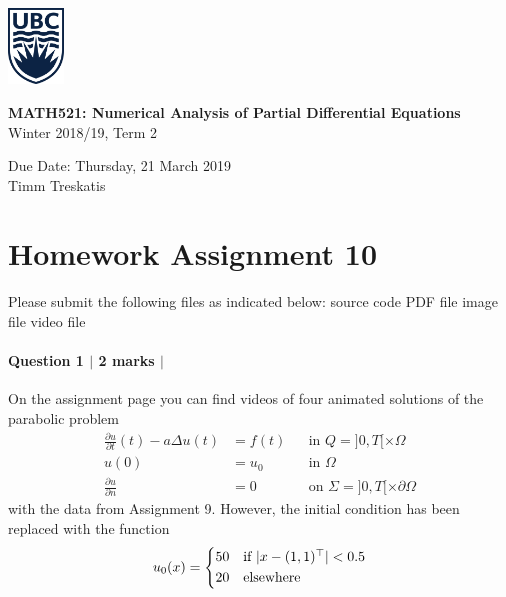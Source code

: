 \documentclass[10pt,letterpaper]{scrartcl}
\begin{document}
\begin{minipage}{.2\textwidth}
\includegraphics[width=42pt]{ubc-logo.png}
\end{minipage}
\hfill
\begin{minipage}{.75\textwidth}
\setlength{\parskip}{6pt}
\begin{flushright}
{
\sffamily
\textbf{MATH521: Numerical Analysis of Partial Differential Equations}\\
Winter 2018/19, Term 2

Due Date: Thursday, 21 March 2019\\
Timm Treskatis
}
\end{flushright}
\end{minipage}

\section*{Homework Assignment 10}

Please submit the following files as indicated below: \hfill \faFileCodeO \: source code \hfill \faFilePdfO \: PDF file \hfill \faFilePictureO \: image file \hfill \faFileMovieO \: video file

\paragraph*{Question 1 $\vert$ 2 marks $\vert$ \faFilePdfO}

On the assignment page you can find videos of four animated solutions of the parabolic problem
\begin{equation}\tag{H}\label{eq:heat}
\begin{aligned}
\frac{\partial u}{\partial t}(t) - a \Delta u(t) &= f(t) && \text{in } Q = ]0,T[ \times \Omega\\
u(0) &= u_0 && \text{in } \Omega\\
\frac{\partial u}{\partial n} &= 0 && \text{on } \Sigma = ]0,T[ \times \partial \Omega
\end{aligned}
\end{equation}
with the data from Assignment 9. However, the initial condition has been replaced with the function
\begin{equation*}
u_0(x) =
\begin{dcases*}
50 & if $\lvert x - (1,1)^\top \rvert < 0.5$\\
20 & elsewhere
\end{dcases*}
\end{equation*}
\end{document}
